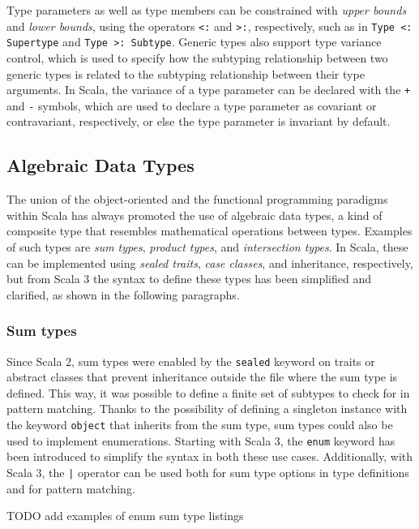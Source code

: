 Type parameters as well as type members can be constrained with \textit{upper bounds} and \textit{lower bounds}, using the operators \texttt{<:} and \texttt{>:}, respectively, such as in \texttt{Type <: Supertype} and \texttt{Type >: Subtype}.
%
Generic types also support type variance control, which is used to specify how the subtyping relationship between two generic types is related to the subtyping relationship between their type arguments.
%
In Scala, the variance of a type parameter can be declared with the \texttt{+} and \texttt{-} symbols, which are used to declare a type parameter as covariant or contravariant, respectively, or else the type parameter is invariant by default.

\subsection{Algebraic Data Types}

The union of the object-oriented and the functional programming paradigms within Scala has always promoted the use of algebraic data types, a kind of composite type that resembles mathematical operations between types.
%
Examples of such types are \textit{sum types}, \textit{product types}, and \textit{intersection types}.
%
In Scala, these can be implemented using \textit{sealed traits}, \textit{case classes}, and inheritance, respectively, but from Scala 3 the syntax to define these types has been simplified and clarified, as shown in the following paragraphs.

\subsubsection{Sum types}

Since Scala 2, sum types were enabled by the \texttt{sealed} keyword on traits or abstract classes that prevent inheritance outside the file where the sum type is defined.
%
This way, it was possible to define a finite set of subtypes to check for in pattern matching.
%
Thanks to the possibility of defining a singleton instance with the keyword \texttt{object} that inherits from the sum type, sum types could also be used to implement enumerations.
%
Starting with Scala 3, the \texttt{enum} keyword has been introduced to simplify the syntax in both these use cases.
%
Additionally, with Scala 3, the \texttt{|} operator can be used both for sum type options in type definitions and for pattern matching.

TODO add examples of enum sum type listings

